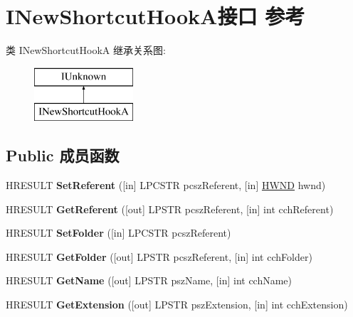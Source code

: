 \hypertarget{interface_i_new_shortcut_hook_a}{}\section{I\+New\+Shortcut\+Hook\+A接口 参考}
\label{interface_i_new_shortcut_hook_a}
类 I\+New\+Shortcut\+HookA 继承关系图\+:\begin{figure}[H]
\begin{center}
\leavevmode
\includegraphics[height=2.000000cm]{interface_i_new_shortcut_hook_a}
\end{center}
\end{figure}
\subsection*{Public 成员函数}
\begin{DoxyCompactItemize}
\item 
\mbox{\label{interface_i_new_shortcut_hook_a_a57856e576666ea4556a1072a902cf025}} 
H\+R\+E\+S\+U\+LT {\bfseries Set\+Referent} (\mbox{[}in\mbox{]} L\+P\+C\+S\+TR pcsz\+Referent, \mbox{[}in\mbox{]} \hyperlink{interfacevoid}{H\+W\+ND} hwnd)
\item 
\mbox{\label{interface_i_new_shortcut_hook_a_a030a4e4d40193398d9ff9d188bff6f65}} 
H\+R\+E\+S\+U\+LT {\bfseries Get\+Referent} (\mbox{[}out\mbox{]} L\+P\+S\+TR pcsz\+Referent, \mbox{[}in\mbox{]} int cch\+Referent)
\item 
\mbox{\label{interface_i_new_shortcut_hook_a_ae4428893e3913d8014c104b98fbaa49a}} 
H\+R\+E\+S\+U\+LT {\bfseries Set\+Folder} (\mbox{[}in\mbox{]} L\+P\+C\+S\+TR pcsz\+Referent)
\item 
\mbox{\label{interface_i_new_shortcut_hook_a_a42383ad436e04248aed86485685cec8b}} 
H\+R\+E\+S\+U\+LT {\bfseries Get\+Folder} (\mbox{[}out\mbox{]} L\+P\+S\+TR pcsz\+Referent, \mbox{[}in\mbox{]} int cch\+Folder)
\item 
\mbox{\label{interface_i_new_shortcut_hook_a_a5b204b95b7ab6881653698890e768c6d}} 
H\+R\+E\+S\+U\+LT {\bfseries Get\+Name} (\mbox{[}out\mbox{]} L\+P\+S\+TR psz\+Name, \mbox{[}in\mbox{]} int cch\+Name)
\item 
\mbox{\label{interface_i_new_shortcut_hook_a_ac3254a3e7c1851e5801560f8d034685f}} 
H\+R\+E\+S\+U\+LT {\bfseries Get\+Extension} (\mbox{[}out\mbox{]} L\+P\+S\+TR psz\+Extension, \mbox{[}in\mbox{]} int cch\+Extension)
\end{DoxyCompactItemize}
